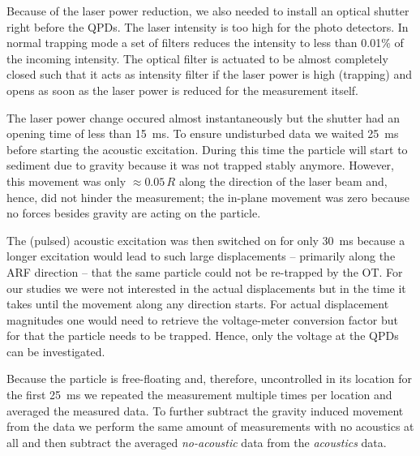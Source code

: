 Because of the laser power reduction, we also needed to install an optical 
shutter right before the QPDs. The laser intensity is too high for the photo 
detectors. In normal trapping mode a set of filters reduces the intensity to 
less than 0.01\% of the incoming intensity. The optical filter is actuated to 
be almost completely closed such that it acts as intensity filter if the laser 
power is high (trapping) and opens as soon as the laser power is reduced for 
the measurement itself.

The laser power change occured almost instantaneously but the shutter had an 
opening time of less than \SI{15}{\ms}. To ensure undisturbed data we waited 
\SI{25}{\ms} before starting the acoustic excitation. During this time the 
particle will start to sediment due to gravity because it was not trapped 
stably anymore. However, this movement was only $\approx 0.05\,R$ along the 
direction of the laser beam and, hence, did not hinder the measurement; the 
in-plane movement was zero because no forces besides gravity are acting on the 
particle.

The (pulsed) acoustic excitation was then switched on for only \SI{30}{\ms} 
because a longer excitation would lead to such large displacements -- primarily 
along the ARF direction -- that the same particle could not be re-trapped by 
the OT. For our studies we were not interested in the actual displacements but 
in the time it takes until the movement along any direction starts. For actual 
displacement magnitudes one would need to retrieve the voltage-meter conversion 
factor but for that the particle needs to be trapped. Hence, only the voltage 
at the QPDs can be investigated.

Because the particle is free-floating and, therefore, uncontrolled in its 
location for the first \SI{25}{\ms} we repeated the measurement multiple times 
per location and averaged the measured data. To further subtract the gravity 
induced movement from the data we perform the same amount of measurements with 
no acoustics at all and then subtract the averaged \emph{no-acoustic} data from 
the \emph{acoustics} data.


